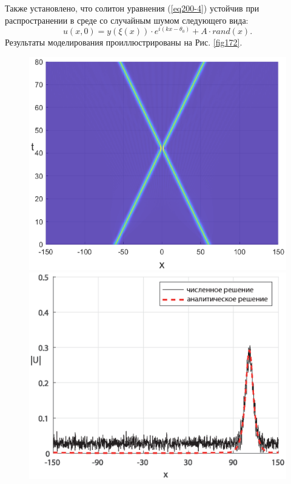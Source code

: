 \documentclass[14pt,a4paper]{extreport}
\begin{document}
			Также установлено, что солитон уравнения (\ref{eq200-4}) устойчив при распространении в среде со случайным шумом следующего вида:
			\begin{equation} \label{eq522}
				u(x,0)=y\left(\xi\left(x\right)\right)\cdot e^{i(kx-\theta_{0})}+A\cdot rand(x).
			\end{equation}
			Результаты моделирования проиллюстрированы на Рис. \ref{fig172}.	
			\begin{figure}[H] %
				\begin{center}
					\begin{minipage}[h]{0.48\linewidth}
						\includegraphics[width=1\linewidth]{fig46.eps}
					\end{minipage}
					\hfill
					\begin{minipage}[h]{0.48\linewidth}
						\includegraphics[width=1\linewidth]{Medvedev_fig17.eps}

\end{minipage}
\end{center}
\end{figure}
\end{document}
